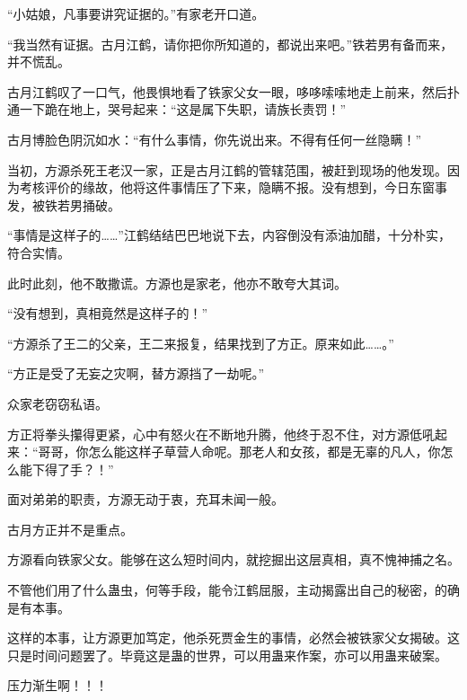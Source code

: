 \begin{this_body}
“小姑娘，凡事要讲究证据的。”有家老开口道。

“我当然有证据。古月江鹤，请你把你所知道的，都说出来吧。”铁若男有备而来，并不慌乱。

古月江鹤叹了一口气，他畏惧地看了铁家父女一眼，哆哆嗦嗦地走上前来，然后扑通一下跪在地上，哭号起来：“这是属下失职，请族长责罚！”

古月博脸色阴沉如水：“有什么事情，你先说出来。不得有任何一丝隐瞒！”

当初，方源杀死王老汉一家，正是古月江鹤的管辖范围，被赶到现场的他发现。因为考核评价的缘故，他将这件事情压了下来，隐瞒不报。没有想到，今日东窗事发，被铁若男捅破。

“事情是这样子的……”江鹤结结巴巴地说下去，内容倒没有添油加醋，十分朴实，符合实情。

此时此刻，他不敢撒谎。方源也是家老，他亦不敢夸大其词。

“没有想到，真相竟然是这样子的！”

“方源杀了王二的父亲，王二来报复，结果找到了方正。原来如此……。”

“方正是受了无妄之灾啊，替方源挡了一劫呢。”

众家老窃窃私语。

方正将拳头攥得更紧，心中有怒火在不断地升腾，他终于忍不住，对方源低吼起来：“哥哥，你怎么能这样子草营人命呢。那老人和女孩，都是无辜的凡人，你怎么能下得了手？！”

面对弟弟的职责，方源无动于衷，充耳未闻一般。

古月方正并不是重点。

方源看向铁家父女。能够在这么短时间内，就挖掘出这层真相，真不愧神捕之名。

不管他们用了什么蛊虫，何等手段，能令江鹤屈服，主动揭露出自己的秘密，的确是有本事。

这样的本事，让方源更加笃定，他杀死贾金生的事情，必然会被铁家父女揭破。这只是时间问题罢了。毕竟这是蛊的世界，可以用蛊来作案，亦可以用蛊来破案。

压力渐生啊！！！

\end{this_body}

